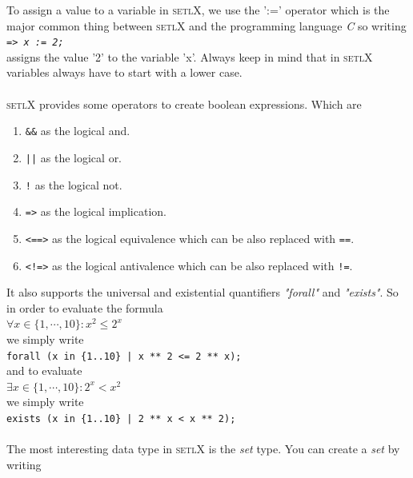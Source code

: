 \documentclass[11pt]{article}
\begin{document}
To assign a value to a variable in \textsc{setlX}, we use the ':=' operator which is the major common thing between \textsc{setlX} and the programming language \textsl{C}
so writing 
\\[0.2cm]
\hspace*{1.3cm}
\texttt{=> \textsl{x := 2;}}
\\[0.2cm]
assigns the value '2' to the variable 'x'. Always keep in mind that in \textsc{setlX} variables always have to start with a lower case.
\\
\\
\textsc{setlX} provides some operators to create boolean expressions. Which are
\begin{enumerate}
\item \texttt{\&\&} as the logical and.
\item \texttt{||} as the logical or.
\item \texttt{!} as the logical not.
\item \texttt{=>} as the logical implication.
\item \texttt{<==>} as the logical equivalence which can be also replaced with \texttt{==}.
\item \texttt{<!=>} as the logical antivalence which can be also replaced with \texttt{!=}.
\end{enumerate}
It also supports the universal and existential quantifiers \textsl{"forall"} and \textsl{"exists"}.
So in order to evaluate the formula
\\[0.2cm]
\hspace*{1.3cm}
$\forall x \in \{ 1, \cdots, 10 \}: x^2 \leq 2^x$
\\[0.2cm]
we simply write
\\[0.2cm]
\hspace*{1.3cm}
\texttt{forall (x in \{1..10\} | x ** 2 <= 2 ** x);}
\\[0.2cm]
and to evaluate
\\[0.2cm]
\hspace*{1.3cm}
$\exists x \in \{ 1, \cdots, 10 \}: 2^x < x^2$
\\[0.2cm]
we simply write
\\[0.2cm]
\hspace*{1.3cm}
\texttt{exists (x in \{1..10\} | 2 ** x < x ** 2);}
\\[0.2cm]
\\
The most interesting data type in \textsc{setlX} is the \textsl{set} type. You can create a \textsl{set} by writing
\\[0.2cm]
\end{document}
